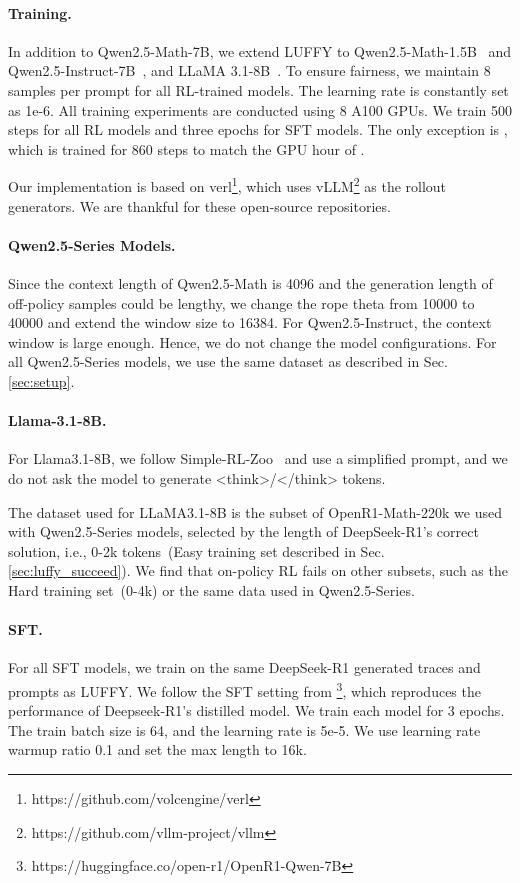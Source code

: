 \paragraph{Training.}

In addition to Qwen2.5-Math-7B, we extend LUFFY to Qwen2.5-Math-1.5B~\cite{qwen2.5_math} and Qwen2.5-Instruct-7B~\cite{qwen2.5}, and LLaMA 3.1-8B~\cite{llama3}. To ensure fairness, we maintain 8 samples per prompt for all RL-trained models. 
The learning rate is constantly set as 1e-6. 
All training experiments are conducted using 8 A100 GPUs. We train 500 steps for all RL models and three epochs for SFT models. The only exception is , which is trained for 860 steps to match the GPU hour of .

Our implementation is based on verl\footnote{https://github.com/volcengine/verl}, which uses vLLM\footnote{https://github.com/vllm-project/vllm} as the rollout generators. We are thankful for these open-source repositories. 


\paragraph{Qwen2.5-Series Models.} Since the context length of Qwen2.5-Math is 4096 and the generation length of off-policy samples could be lengthy, we change the rope theta from 10000 to 40000 and extend the window size to 16384. For Qwen2.5-Instruct, the context window is large enough. Hence, we do not change the model configurations. 
For all Qwen2.5-Series models, we use the same dataset as described in Sec. \ref{sec:setup}. 

\paragraph{Llama-3.1-8B.} For Llama3.1-8B, we follow Simple-RL-Zoo~\cite{simplerl-zoo} and use a simplified prompt, and we do not ask the model to generate <think>/</think> tokens. 

The dataset used for LLaMA3.1-8B is the subset of OpenR1-Math-220k we used with Qwen2.5-Series models, selected by the length of DeepSeek-R1's correct solution, i.e., 0-2k tokens~(Easy training set described in Sec. \ref{sec:luffy_succeed}). We find that on-policy RL fails on other subsets, such as the Hard training set~(0-4k) or the same data used in Qwen2.5-Series. 

\paragraph{SFT.} For all SFT models, we train on the same DeepSeek-R1 generated traces and prompts as LUFFY. 
We follow the SFT setting from \footnote{https://huggingface.co/open-r1/OpenR1-Qwen-7B}, which reproduces the performance of Deepseek-R1's distilled model. 
We train each model for 3 epochs. The train batch size is 64, and the learning rate is 5e-5. We use learning rate warmup ratio 0.1 and set the max length to 16k. 

